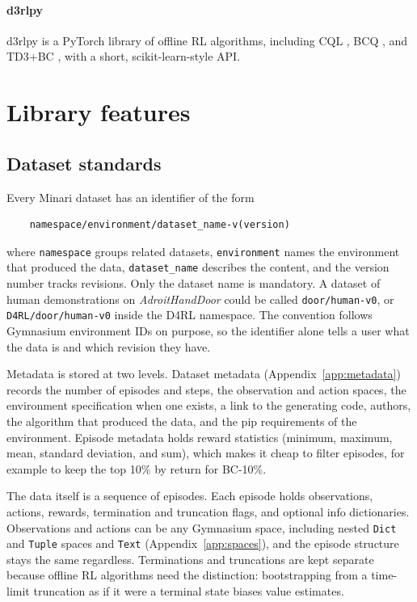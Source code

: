 \documentclass{article}
\begin{document}
\paragraph{d3rlpy}
d3rlpy \citep{d3rlpy} is a PyTorch library of offline RL algorithms, including CQL \citep{CQL}, BCQ \citep{BCQ}, and TD3+BC \citep{TD3+BC}, with a short, scikit-learn-style API.


\section{Library features}
\label{sec:library_features}

\subsection{Dataset standards}
Every Minari dataset has an identifier of the form
\begin{verbatim}
    namespace/environment/dataset_name-v(version)
\end{verbatim}
where \verb|namespace| groups related datasets, \verb|environment| names the environment that produced the data, \verb|dataset_name| describes the content, and the version number tracks revisions. Only the dataset name is mandatory. A dataset of human demonstrations on \textit{AdroitHandDoor} could be called \verb|door/human-v0|, or \verb|D4RL/door/human-v0| inside the D4RL namespace. The convention follows Gymnasium environment IDs on purpose, so the identifier alone tells a user what the data is and which revision they have.

Metadata is stored at two levels. Dataset metadata (Appendix~\ref{app:metadata}) records the number of episodes and steps, the observation and action spaces, the environment specification when one exists, a link to the generating code, authors, the algorithm that produced the data, and the pip requirements of the environment. Episode metadata holds reward statistics (minimum, maximum, mean, standard deviation, and sum), which makes it cheap to filter episodes, for example to keep the top 10\% by return for BC-10\%.

The data itself is a sequence of episodes. Each episode holds observations, actions, rewards, termination and truncation flags, and optional info dictionaries. Observations and actions can be any Gymnasium space, including nested \verb|Dict| and \verb|Tuple| spaces and \verb|Text| (Appendix~\ref{app:spaces}), and the episode structure stays the same regardless. Terminations and truncations are kept separate because offline RL algorithms need the distinction: bootstrapping from a time-limit truncation as if it were a terminal state biases value estimates.
\end{document}
